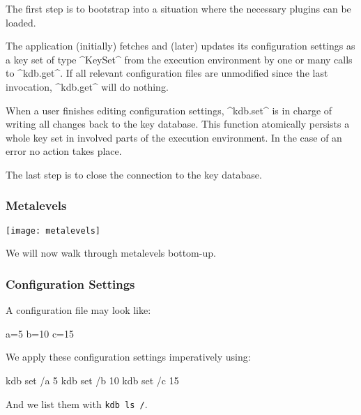 \begin{frame}[fragile]
	\begin{description}[align=left]
	\item[kdb.open():]
	The first step is to bootstrap into a situation where the necessary plugins can be loaded.
	\item[kdb.get(\texttt{KeySet}):] 
	The application (initially) fetches and (later) updates its configuration settings as a key set of type ^KeySet^ from the execution environment by one or many calls to ^kdb.get^.
	If all relevant configuration files are unmodified since the last invocation, ^kdb.get^ will do nothing.
	\item[kdb.set(\texttt{KeySet}):] 
	When a user finishes editing configuration settings, ^kdb.set^ is in charge of writing all changes back to the key database.
	This function atomically persists a whole key set in involved parts of the execution environment.
	In the case of an error no action takes place.
	\item[kdb.close():] 
	The last step is to close the connection to the key database.
	\end{description}
\end{frame}

\begin{frame}
	\frametitle{Metalevels}
	\texttt{[image: metalevels]}

	We will now walk through metalevels bottom-up.
\end{frame}

\begin{frame}[fragile]
	\frametitle{Configuration Settings}

	A configuration file may look like:

	\begin{code}[language=CfgElektra]
	a=5
	b=10
	c=15
	\end{code}

	We apply these configuration settings imperatively using:

	\begin{code}[language=bash]
	kdb set /a 5
	kdb set /b 10
	kdb set /c 15
	\end{code}

	And we list them with \lstinline[language=bash,morekeywords={ls},showspaces=no]^kdb ls /^.
\end{frame}

